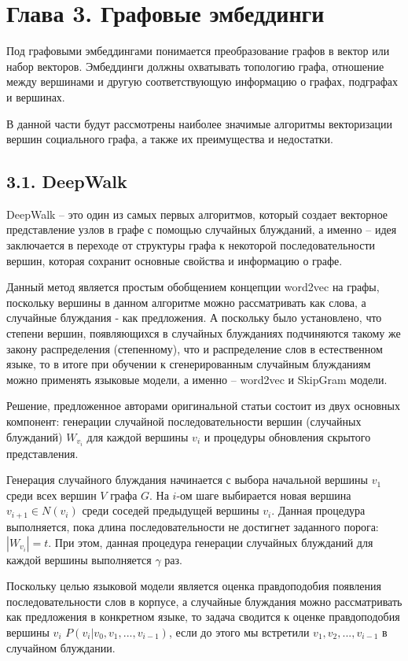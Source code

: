 \section{Глава 3. Графовые эмбеддинги}
Под графовыми эмбеддингами понимается преобразование графов в вектор или набор векторов. Эмбеддинги должны охватывать топологию графа, отношение между вершинами и другую соответствующую информацию о графах, подграфах и вершинах.

В данной части будут рассмотрены наиболее значимые алгоритмы векторизации вершин социального графа, а также их преимущества и недостатки.

\subsection{3.1. DeepWalk}

DeepWalk \cite{DeepWalk} -- это один из самых первых алгоритмов, который создает векторное представление узлов в графе с помощью случайных блужданий, а именно -- идея заключается в переходе от структуры графа к некоторой последовательности вершин, которая сохранит основные свойства и информацию о графе. 

Данный метод является простым обобщением концепции word2vec \cite{word2vec} на графы, поскольку вершины в данном алгоритме можно рассматривать как слова, а случайные блуждания - как предложения. А поскольку было установлено, что степени вершин, появляющихся в случайных блужданиях подчиняются такому же закону распределения (степенному), что и распределение слов в естественном языке, то в итоге при обучении к сгенерированным случайным блужданиям можно применять языковые модели, а именно -- word2vec и SkipGram модели.  


Решение, предложенное авторами оригинальной статьи \cite{DeepWalk} состоит
из двух основных компонент: генерации случайной последовательности вершин (случайных блужданий) $W_{v_i}$ для каждой вершины $v_i$ и процедуры обновления скрытого представления.

Генерация случайного блуждания начинается с выбора начальной
вершины $v_1$ среди всех вершин $V$ графа $G$.  На $i$-ом шаге выбирается новая вершина $v_{i+1} \in N(v_i)$ среди соседей предыдущей вершины $v_i$. Данная процедура выполняется, пока длина последовательности
не достигнет заданного порога: $|W_{v_i}| = t$. При этом, данная процедура генерации случайных блужданий для каждой вершины выполняется $\gamma$ раз.

Поскольку целью языковой модели является оценка правдоподобия появления последовательности слов в корпусе, а случайные блуждания можно рассматривать как предложения в конкретном языке, то задача сводится к оценке правдоподобия вершины $v_i$ $P(v_i| v_0, v_1, ..., v_{i-1})$, если до этого мы встретили  $v_1, v_2, ..., v_{i-1}$ в случайном блуждании.

